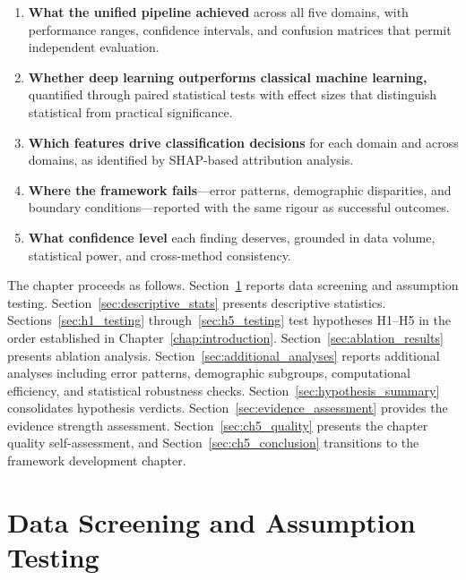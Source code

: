 \begin{enumerate}[label=(\alph*)]
    \item \textbf{What the unified pipeline achieved} across all five domains, with performance ranges, confidence intervals, and confusion matrices that permit independent evaluation.
    \item \textbf{Whether deep learning outperforms classical machine learning,} quantified through paired statistical tests with effect sizes that distinguish statistical from practical significance.
    \item \textbf{Which features drive classification decisions} for each domain and across domains, as identified by SHAP-based attribution analysis.
    \item \textbf{Where the framework fails}---error patterns, demographic disparities, and boundary conditions---reported with the same rigour as successful outcomes.
    \item \textbf{What confidence level} each finding deserves, grounded in data volume, statistical power, and cross-method consistency.
\end{enumerate}

The chapter proceeds as follows. Section~\ref{sec:data_screening} reports data screening and assumption testing. Section~\ref{sec:descriptive_stats} presents descriptive statistics. Sections~\ref{sec:h1_testing} through~\ref{sec:h5_testing} test hypotheses H1--H5 in the order established in Chapter~\ref{chap:introduction}. Section~\ref{sec:ablation_results} presents ablation analysis. Section~\ref{sec:additional_analyses} reports additional analyses including error patterns, demographic subgroups, computational efficiency, and statistical robustness checks. Section~\ref{sec:hypothesis_summary} consolidates hypothesis verdicts. Section~\ref{sec:evidence_assessment} provides the evidence strength assessment. Section~\ref{sec:ch5_quality} presents the chapter quality self-assessment, and Section~\ref{sec:ch5_conclusion} transitions to the framework development chapter.


\section{Data Screening and Assumption Testing}
\label{sec:data_screening}

